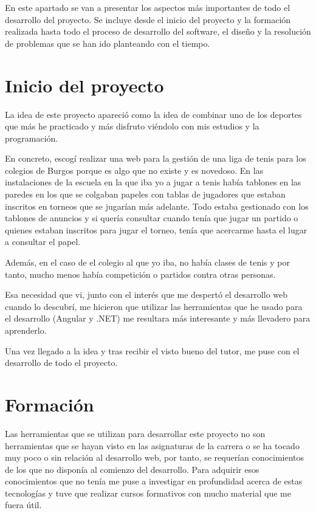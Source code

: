 
En este apartado se van a presentar los aspectos más importantes de todo el desarrollo del proyecto. Se incluye desde el inicio del proyecto y la formación realizada hasta todo el proceso de desarrollo del software, el diseño y la resolución de problemas que se han ido planteando con el tiempo.

\section{Inicio del proyecto}\label{inicio-del-proyecto}

La idea de este proyecto apareció como la idea de combinar uno de los deportes que más he practicado y más disfruto viéndolo con mis estudios y la programación.

En concreto, escogí realizar una web para la gestión de una liga de tenis para los colegios de Burgos porque es algo que no existe y es novedoso. En las instalaciones de la escuela en la que iba yo a jugar a tenis había tablones en las paredes en los que se colgaban papeles con tablas de jugadores que estaban inscritos en torneos que se jugarían más adelante. Todo estaba gestionado con los tablones de anuncios y si quería consultar cuando tenía que jugar un partido o quienes estaban inscritos para jugar el torneo, tenía que acercarme hasta el lugar a consultar el papel.

Además, en el caso de el colegio al que yo iba, no había clases de tenis y por tanto, mucho menos había competición o partidos contra otras personas. 

Esa necesidad que vi, junto con el interés que me despertó el desarrollo web cuando lo descubrí, me hicieron que utilizar las herramientas que he usado para el desarrollo (Angular y .NET) me resultara más interesante y más llevadero para aprenderlo.

Una vez llegado a la idea y tras recibir el visto bueno del tutor, me puse con el desarrollo de todo el proyecto.

\section{Formación}\label{formacion}

Las herramientas que se utilizan para desarrollar este proyecto no son herramientas que se hayan visto en las asignaturas de la carrera o se ha tocado muy poco o sin relación al desarrollo web, por tanto, se requerían conocimientos de los que no disponía al comienzo del desarrollo. Para adquirir esos conocimientos que no tenía me puse a investigar en profundidad acerca de estas tecnologías y tuve que realizar cursos formativos con mucho material que me fuera útil.

